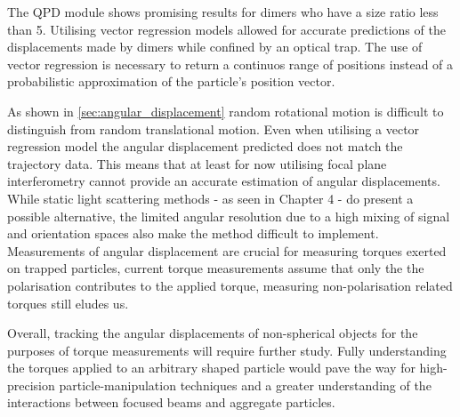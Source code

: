 The QPD module shows promising results for dimers who have a size 
ratio less than 5. Utilising vector regression models allowed for 
accurate predictions of the displacements made by dimers while 
confined by an optical trap. The use of vector regression is necessary
to return a continuos range of positions instead of a probabilistic
approximation of the particle's position vector. 

As shown in \ref{sec:angular_displacement} random rotational motion 
is difficult to distinguish from random translational motion. Even
when utilising a vector regression model the angular displacement
predicted does not match the trajectory data. This means that at least
for now utilising focal plane interferometry cannot provide an 
accurate estimation of angular displacements. While static light 
scattering methods - as seen in Chapter 4 - do present a possible 
alternative, the limited angular resolution due to a high mixing 
of signal and orientation spaces also make the method difficult to 
implement. Measurements of angular displacement are crucial for 
measuring torques exerted on trapped particles, current torque 
measurements assume that only the the polarisation contributes to 
the applied torque, measuring non-polarisation related torques still 
eludes us. 

Overall, tracking the angular displacements of non-spherical 
objects for the purposes of torque measurements will require 
further study. Fully understanding the torques applied to an 
arbitrary shaped particle would pave the way for high-precision 
particle-manipulation techniques and a greater understanding 
of the interactions between focused beams and aggregate particles.

 

